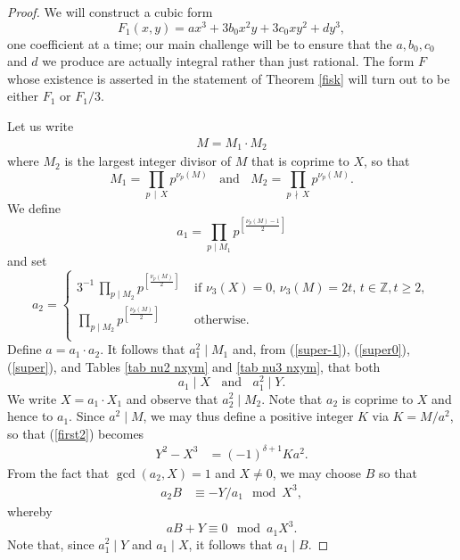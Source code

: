\begin{proof}
We will construct a cubic form
$$
 F_1(x,y) = ax^3 + 3b_0 x^2y + 3c_0 xy^2 + dy^3,
$$
one coefficient at a time; our main challenge will be to ensure that the $a, b_0, c_0$ and $d$ we produce are actually integral rather than just rational. The form $F$ whose existence is asserted
in the statement of Theorem \ref{fisk} will turn out to be either $F_1$ or $F_1/3$. 

Let us write
\begin{align*}
  M = M_1 \cdot M_2
\end{align*}
where $M_2$ is the largest integer divisor of $M$ that is coprime to $X$, so that
$$
M_1 = \prod_{p \, \mid  \, X} p^{\nu_p (M)} \; \; \mbox{ and } \; \;  M_2 = \prod_{p \, \nmid \, X} p^{\nu_p (M)}.
$$
We define
\begin{equation} \label{a1}
a_1 = \prod_{p \mid M_1} p^{\left[ \frac{\nu_p (M)-1}{2} \right]}
\end{equation}
and set
\begin{equation} \label{a2}
a_2 = \left\{
\begin{array}{cl}
3^{-1} \, \prod_{p \mid M_2} p^{\left[ \frac{\nu_p (M)}{2} \right]} & \mbox{ if }  \nu_3 (X)=0, \, \nu_3(M) =2t, \, t \in \mathbb{Z}, t \geq 2,  \\
\prod_{p \mid M_2} p^{\left[ \frac{\nu_p (M)}{2} \right]} & \mbox{ otherwise. } \\
\end{array}
\right.
\end{equation}
Define $a = a_1 \cdot a_2$.
It follows that $a_1^2 \mid M_1$ and, from (\ref{super-1}), (\ref{super0}), (\ref{super}), and Tables \ref{tab nu2 nxym} and \ref{tab nu3 nxym}, that both
$$
a_1 \mid X \; \; \mbox{ and } \; \;  a_1^2 \mid Y.
$$
We write $X = a_1 \cdot X_1$ and observe that $a_2^2 \mid M_2$. Note that $a_2$ is coprime to $X$ and hence to $a_1$. 
Since $a^2 \mid M$, we may thus define a positive integer $K$ via $K = M/a^2$, so that (\ref{first2}) becomes
\begin{align*}
Y^2-X^3 &= (-1)^{\delta+1} Ka^2.
\end{align*}
From the fact that $\gcd (a_2,X)=1$ and $X \neq 0$, we may choose $B$ so that
\begin{align*}
  a_2 B &\equiv -Y/a_1 \mod{X^3},
\end{align*}
whereby 
\begin {equation} \label{truth}
a B+Y \equiv 0 \mod{a_1X^3}.
\end{equation}  
Note that, since $a_1^2 \mid Y$ and $a_1 \mid X$, it follows that $a_1 \mid B$.

\end{proof}
